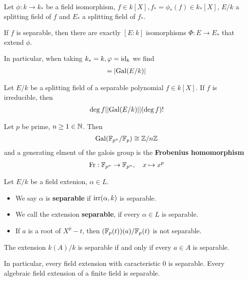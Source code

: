 \begin{thm}[]
  Let $\phi: k \to k_{\ast}$ be a field isomorphism, $f \in k[X], f_{\ast} = \phi_{\ast}(f) \in k_{\ast}[X]$, $E/k$ a splitting field of $f$ and $E_{\ast}$ a splitting field of $f_{\ast}$.

  If $f$ is separable, then there are exactly $[E:k]$ isomorphisms $\Phi: E \to E_{\ast}$ that extend $\phi$.

  In particular, when taking $k_{\ast} =k, \varphi = \operatorname{id}_k$ we find
  \begin{align*}
    [E:k] = \abs{\Gal(E/k)}
  \end{align*}
\end{thm}


\begin{cor}[]
  Let $E/k$ be a splitting field of a separable polynomial $f \in k[X]$.
  If $f$ is irreducible, then
  \begin{align*}
    \degree f | \abs{\Gal(E/k)} | (\degree f)!
  \end{align*}
\end{cor}


\begin{thm}[]
Let $p$ be prime, $n \geq 1\in \mathbb{N}$. Then
\begin{align*}
  \operatorname{Gal}(\mathbb{F}_{p^{n}}/\mathbb{F}_p) \cong \mathbb{Z}/n\mathbb{Z}
\end{align*}
and a generating elment of the galois group is the \textbf{Frobenius homomorphism}
\begin{align*}
  \text{Fr}: \mathbb{F}_{p^{n}} \to \mathbb{F}_{p^{n}}, \quad x \mapsto  x^{p}
\end{align*}
\end{thm}


\begin{dfn}[]
  Let $E/k$ be a field extenion, $\alpha \in L$.
  \begin{itemize}
    \item We say $\alpha$ is \textbf{separable} if $\operatorname{irr}(\alpha,k)$ is separable.
    \item We call the extension \textbf{separable}, if every $\alpha \in L$ is separable.
  \end{itemize}
\end{dfn}

\begin{itemize}
  \item If $a$ is a root of $X^{p} -t$, then $(\mathbb{F}_p(t))(a)/\mathbb{F}_p(t)$ is not separable.
\end{itemize}

\begin{prop}[]
  The extension $k(A)/k$ is separable if and only if every $a \in A$ is separable.

  In particular, every field extension with caracteristic $0$ is separable.
  Every algebraic field extension of a finite field is separable.
\end{prop}






